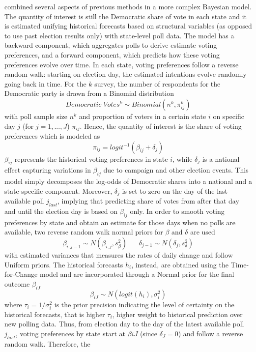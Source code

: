 \documentclass[
  12pt]{article}
\begin{document}
\citep{lin:2013} combined several aspects of previous methods in a more
complex Bayesian model. The quantity of interest is still the Democratic
share of vote in each state and it is estimated unifying historical
forecasts based on structural variables (as opposed to use past election
results only) with state-level poll data. The model has a backward
component, which aggregates polls to derive estimate voting preferences,
and a forward component, which predicts how these voting preferences
evolve over time. In each state, voting preferences follow a reverse
random walk: starting on election day, the estimated intentions evolve
randomly going back in time. For the \(k\) survey, the number of
respondents for the Democratic party is drawn from a Binomial
distribution \[Democratic \; Votes^k \sim Binomial(n^k, \pi_{ij}^k)\]
with poll sample size \(n^k\) and proportion of voters in a certain
state \(i\) on specific day \(j\) (for \(j = 1,...,J\)) \(\pi_{ij}\).
Hence, the quantity of interest is the share of voting preferences which
is modeled as \[\pi_{ij} = logit^{-1}(\beta_{ij} + \delta_j)\]
\(\beta_{ij}\) represents the historical voting preferences in state
\(i\), while \(\delta_j\) is a national effect capturing variations in
\(\beta_{ij}\) due to campaign and other election events. This model
simply decomposes the log-odds of Democratic shares into a national and
a state-specific component. Moreover, \(\delta_j\) is set to zero on the
day of the last available poll \(j_{last}\), implying that predicting
share of votes from after that day and until the election day is based
on \(\beta_{ij}\) only. In order to smooth voting preferences by state
and obtain an estimate for those days when no polls are available, two
reverse random walk normal priors for \(\beta\) and \(\delta\) are used
\[\beta_{i,j-1} \sim N(\beta_{i,j}, s^2_{\beta}) \;\;\;\;\;\; \delta_{j-1} \sim N(\delta_j, s^2_{\delta})\]
with estimated variances that measures the rates of daily change and
follow Uniform priors. The historical forecasts \(h_i\), instead, are
obtained using the \citet{abr:2008} Time-for-Change model and are
incorporated through a Normal prior for the final outcome \(\beta_{iJ}\)
\[\beta_{iJ} \sim N(logit(h_i), \sigma_i^2)\] where
\(\tau_i = 1 / \sigma_i^2\) is the prior precision indicating the level
of certainty on the historical forecasts, that is higher \(\tau_i\),
higher weight to historical prediction over new polling data. Thus, from
election day to the day of the latest available poll \(j_{last}\),
voting preferences by state start at \(\beta{iJ}\) (since
\(\delta_J = 0\)) and follow a reverse random walk. Therefore, the
\end{document}
